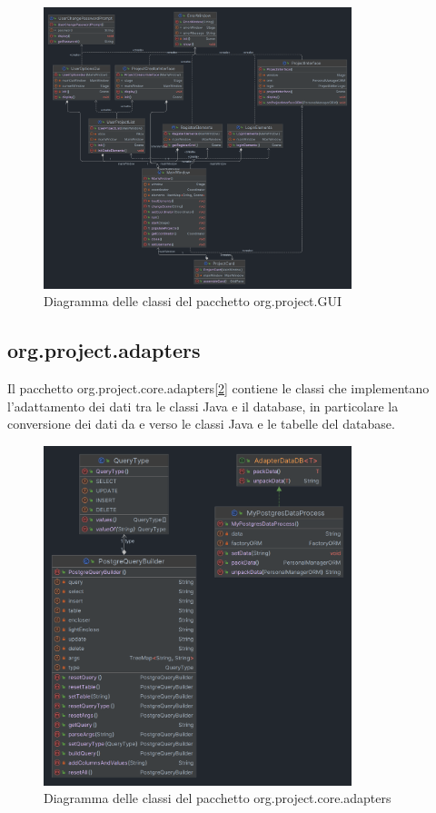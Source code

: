 \documentclass[
    10pt, %
    a4paper, %
    oneside, %
    headinclude,footinclude, %
    BCOR5mm, %
]{scrartcl}
\begin{document}
    \begin{figure}[tb]
        \centering
        \includegraphics[width=0.8\textwidth]{Figures/UML/GUI}
        \caption{Diagramma delle classi del pacchetto org.project.GUI}
        \label{fig:diagrammaClassiGUI}
    \end{figure}

    \subsection{org.project.adapters}\label{subsec:adapters}

    Il pacchetto org.project.core.adapters[\ref{fig:diagrammaClassiAdapters}] contiene le classi che implementano
    l'adattamento dei dati tra le classi Java e il database, in particolare la conversione dei dati da e verso le
    classi Java e le tabelle del database.

    \begin{figure}[tb]
        \centering
        \includegraphics[width=0.8\textwidth]{Figures/UML/ADAPTERS}
        \caption{Diagramma delle classi del pacchetto org.project.core.adapters}
        \label{fig:diagrammaClassiAdapters}
    \end{figure}
\end{document}
